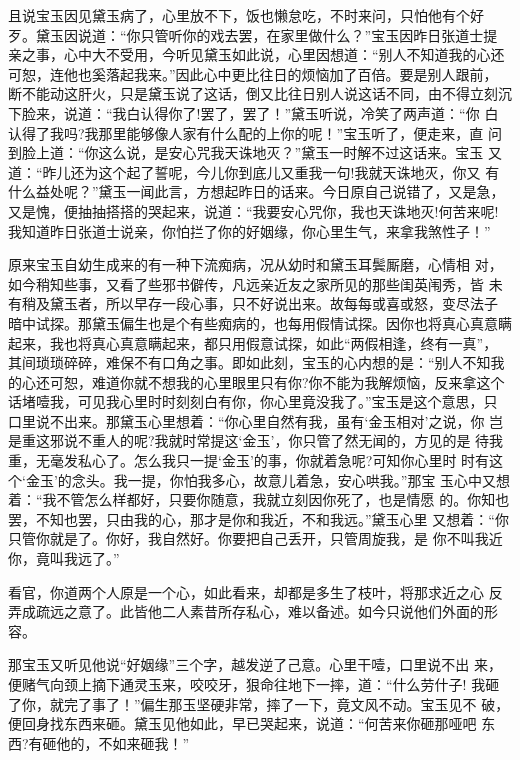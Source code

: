 且说宝玉因见黛玉病了，心里放不下，饭也懒怠吃，不时来问，只怕他有个好
歹。黛玉因说道：“你只管听你的戏去罢，在家里做什么？”宝玉因昨日张道士提
亲之事，心中大不受用，今听见黛玉如此说，心里因想道：“别人不知道我的心还
可恕，连他也奚落起我来。”因此心中更比往日的烦恼加了百倍。要是别人跟前，
断不能动这肝火，只是黛玉说了这话，倒又比往日别人说这话不同，由不得立刻沉
下脸来，说道：“我白认得你了!罢了，罢了！”黛玉听说，冷笑了两声道：“你
白认得了我吗?我那里能够像人家有什么配的上你的呢！”宝玉听了，便走来，直
问到脸上道：“你这么说，是安心咒我天诛地灭？”黛玉一时解不过这话来。宝玉
又道：“昨儿还为这个起了誓呢，今儿你到底儿又重我一句!我就天诛地灭，你又
有什么益处呢？”黛玉一闻此言，方想起昨日的话来。今日原自己说错了，又是急，
又是愧，便抽抽搭搭的哭起来，说道：“我要安心咒你，我也天诛地灭!何苦来呢!
我知道昨日张道士说亲，你怕拦了你的好姻缘，你心里生气，来拿我煞性子！”

原来宝玉自幼生成来的有一种下流痴病，况从幼时和黛玉耳鬓厮磨，心情相
对，如今稍知些事，又看了些邪书僻传，凡远亲近友之家所见的那些闺英闱秀，皆
未有稍及黛玉者，所以早存一段心事，只不好说出来。故每每或喜或怒，变尽法子
暗中试探。那黛玉偏生也是个有些痴病的，也每用假情试探。因你也将真心真意瞒
起来，我也将真心真意瞒起来，都只用假意试探，如此“两假相逢，终有一真”，
其间琐琐碎碎，难保不有口角之事。即如此刻，宝玉的心内想的是：“别人不知我
的心还可恕，难道你就不想我的心里眼里只有你?你不能为我解烦恼，反来拿这个
话堵噎我，可见我心里时时刻刻白有你，你心里竟没我了。”宝玉是这个意思，只
口里说不出来。那黛玉心里想着：“你心里自然有我，虽有‘金玉相对’之说，你
岂是重这邪说不重人的呢?我就时常提这‘金玉’，你只管了然无闻的，方见的是
待我重，无毫发私心了。怎么我只一提‘金玉’的事，你就着急呢?可知你心里时
时有这个‘金玉’的念头。我一提，你怕我多心，故意儿着急，安心哄我。”那宝
玉心中又想着：“我不管怎么样都好，只要你随意，我就立刻因你死了，也是情愿
的。你知也罢，不知也罢，只由我的心，那才是你和我近，不和我远。”黛玉心里
又想着：“你只管你就是了。你好，我自然好。你要把自己丢开，只管周旋我，是
你不叫我近你，竟叫我远了。”

看官，你道两个人原是一个心，如此看来，却都是多生了枝叶，将那求近之心
反弄成疏远之意了。此皆他二人素昔所存私心，难以备述。如今只说他们外面的形
容。

那宝玉又听见他说“好姻缘”三个字，越发逆了己意。心里干噎，口里说不出
来，便赌气向颈上摘下通灵玉来，咬咬牙，狠命往地下一摔，道：“什么劳什子!
我砸了你，就完了事了！”偏生那玉坚硬非常，摔了一下，竟文风不动。宝玉见不
破，便回身找东西来砸。黛玉见他如此，早已哭起来，说道：“何苦来你砸那哑吧
东西?有砸他的，不如来砸我！”

